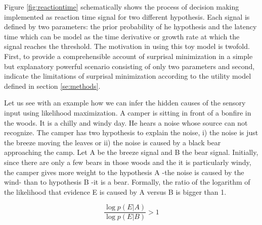 \documentclass[11pt,twocolumn]{article}
\begin{document}
Figure \ref{fig:reactiontime} schematically shows the process of decision making implemented as reaction time signal for two different hypothesis. Each signal is defined by two parameters: the prior probability of he hypothesis and the latency time which can be model as the time derivative or growth rate at which the signal reaches the threshold. 
The motivation in using this toy model is twofold. First, to provide a comprehensible account of surprisal minimization in a simple but explanatory powerful scenario consisting of only two parameters and second, indicate the limitations of surprisal minimization according to the utility model defined in section \ref{se:methods}.


Let us see with an example how we can infer the hidden causes of the sensory input using likelihood maximization. A camper is sitting in front of a bonfire in the woods. It is a chilly and windy day. He hears a noise whose source can not recognize. The camper has two hypothesis to explain the noise, i) the noise is just the breeze moving the leaves or ii) the noise is caused by a black bear approaching the camp. Let A be the breeze signal and B the bear signal. Initially, since there are only a few bears in those woods and the it is particularly windy, the camper gives more weight to the hypothesis A -the noise is caused by the wind- than to hypothesis B -it is a bear. Formally, the ratio of the logarithm of the likelihood that evidence E is caused by A versus B is bigger than 1. 

\begin{equation}
 \frac{\log p(E|A)}{\log p(E|B)} > 1 
\label{eq:lkhratio}
\end{equation}
\end{document}
